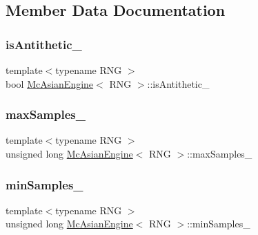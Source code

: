 \subsection{Member Data Documentation}
\hypertarget{class_mc_asian_engine_ae5678e3c643e058d4c5f2d6b0e5fe515}{}\label{class_mc_asian_engine_ae5678e3c643e058d4c5f2d6b0e5fe515} 
\subsubsection{\texorpdfstring{is\+Antithetic\+\_\+}{isAntithetic\_}}
{\footnotesize\ttfamily template$<$typename R\+NG $>$ \\
bool \hyperlink{class_mc_asian_engine}{Mc\+Asian\+Engine}$<$ R\+NG $>$\+::is\+Antithetic\+\_\+\hspace{0.3cm}{\ttfamily [private]}}

\hypertarget{class_mc_asian_engine_a512cbb76b5daeb503dc55c2ef72dd74f}{}\label{class_mc_asian_engine_a512cbb76b5daeb503dc55c2ef72dd74f} 
\subsubsection{\texorpdfstring{max\+Samples\+\_\+}{maxSamples\_}}
{\footnotesize\ttfamily template$<$typename R\+NG $>$ \\
unsigned long \hyperlink{class_mc_asian_engine}{Mc\+Asian\+Engine}$<$ R\+NG $>$\+::max\+Samples\+\_\+\hspace{0.3cm}{\ttfamily [private]}}

\hypertarget{class_mc_asian_engine_a71e8848ac19c88cee59590b9cab10700}{}\label{class_mc_asian_engine_a71e8848ac19c88cee59590b9cab10700} 
\subsubsection{\texorpdfstring{min\+Samples\+\_\+}{minSamples\_}}
{\footnotesize\ttfamily template$<$typename R\+NG $>$ \\
unsigned long \hyperlink{class_mc_asian_engine}{Mc\+Asian\+Engine}$<$ R\+NG $>$\+::min\+Samples\+\_\+\hspace{0.3cm}{\ttfamily [private]}}

